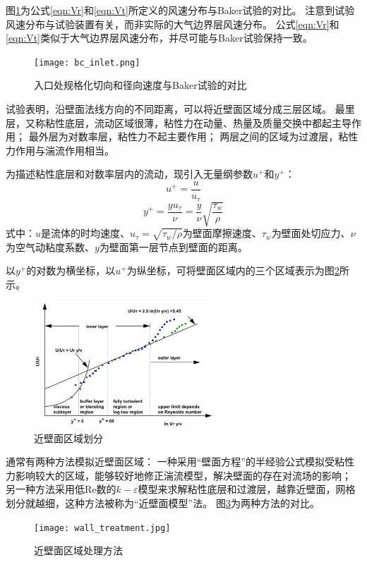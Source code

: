 图\ref{fig:bc-inlet}为公式\eqref{eqn:Vr}和\eqref{eqn:Vt}所定义的风速分布与Baker\cite{baker1981boundary}试验的对比。
注意到试验风速分布与试验装置有关，而非实际的大气边界层风速分布。
公式\eqref{eqn:Vr}和\eqref{eqn:Vt}类似于大气边界层风速分布，并尽可能与Baker\cite{baker1981boundary}试验保持一致。
\begin{figure}[!htbp]
  \centering
  \texttt{[image: bc\_inlet.png]}
  \caption{入口处规格化切向和径向速度与Baker\cite{baker1981boundary}试验的对比}
  \label{fig:bc-inlet}
\end{figure}

试验表明，沿壁面法线方向的不同距离，可以将近壁面区域分成三层区域。
最里层，又称粘性底层，流动区域很薄，粘性力在动量、热量及质量交换中都起主导作用；
最外层为对数率层，粘性力不起主要作用；
两层之间的区域为过渡层，粘性力作用与湍流作用相当。

为描述粘性底层和对数率层内的流动，现引入无量纲参数$u^{+}$和$y^{+}$：
\begin{equation}
  u^{+} = \frac{u}{u_{\tau}}
\end{equation}
\begin{equation}
  y^{+} = \frac{y u_{\tau}}{\nu} = \frac{y}{\nu} \sqrt{\frac{\tau_w}{\rho}}
\end{equation}
式中：$u$是流体的时均速度、$u_{\tau}=\sqrt{\tau_w/\rho}$为壁面摩擦速度、$\tau_w$为壁面处切应力、$\nu$为空气动粘度系数、$y$为壁面第一层节点到壁面的距离。

以$y^{+}$的对数为横坐标，以$u^{+}$为纵坐标，可将壁面区域内的三个区域表示为图\ref{fig:uplus}所示\cite{fluent2015theory}。
\begin{figure}[!htbp]
  \centering
  \includegraphics[width=0.6\textwidth]{figures/tornado/uplus.jpg}
  \caption{近壁面区域划分}\label{fig:uplus}
\end{figure}

通常有两种方法模拟近壁面区域：
一种采用“壁面方程”的半经验公式模拟受粘性力影响较大的区域，能够较好地修正湍流模型，解决壁面的存在对流场的影响；
另一种方法采用低$\mathrm{Re}$数的$k-\varepsilon$模型来求解粘性底层和过渡层，越靠近壁面，网格划分就越细，这种方法被称为“近壁面模型”法。
图\ref{fig:wall-treatment}为两种方法的对比\cite{fluent2015theory}。
\begin{figure}[!htbp]
  \centering
  \texttt{[image: wall\_treatment.jpg]}
  \caption{近壁面区域处理方法}
  \label{fig:wall-treatment}
\end{figure}

